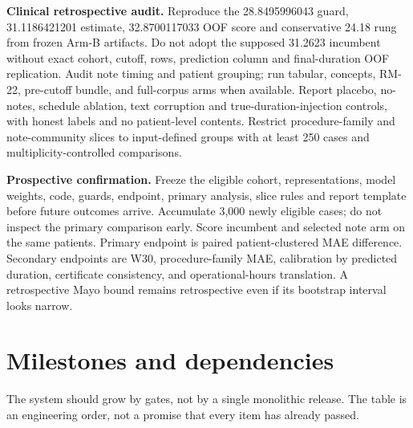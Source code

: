 \documentclass[11pt]{article}
\begin{document}
\textbf{Clinical retrospective audit.} Reproduce the 28.8495996043 guard, 31.1186421201 estimate, 32.8700117033 OOF score and conservative 24.18 rung from frozen Arm-B artifacts. Do not adopt the supposed 31.2623 incumbent without exact cohort, cutoff, rows, prediction column and final-duration OOF replication. Audit note timing and patient grouping; run tabular, concepts, RM-22, pre-cutoff bundle, and full-corpus arms when available. Report placebo, no-notes, schedule ablation, text corruption and true-duration-injection controls, with honest labels and no patient-level contents. Restrict procedure-family and note-community slices to input-defined groups with at least 250 cases and multiplicity-controlled comparisons.

\textbf{Prospective confirmation.} Freeze the eligible cohort, representations, model weights, code, guards, endpoint, primary analysis, slice rules and report template before future outcomes arrive. Accumulate 3,000 newly eligible cases; do not inspect the primary comparison early. Score incumbent and selected note arm on the same patients. Primary endpoint is paired patient-clustered MAE difference. Secondary endpoints are W30, procedure-family MAE, calibration by predicted duration, certificate consistency, and operational-hours translation. A retrospective Mayo bound remains retrospective even if its bootstrap interval looks narrow.

\section{Milestones and dependencies}
The system should grow by gates, not by a single monolithic release. The table is an engineering order, not a promise that every item has already passed.
\end{document}
